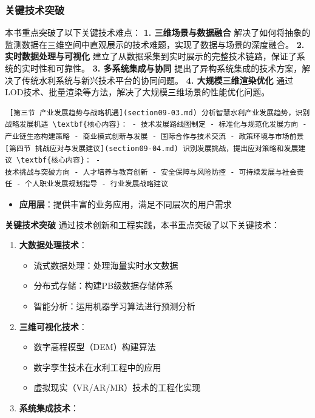 {\subsubsection{关键技术突破}\label{ux5173ux952eux6280ux672fux7a81ux7834} 本书重点突破了以下关键技术难点： \textbf{1. 三维场景与数据融合}
解决了如何将抽象的监测数据在三维空间中直观展示的技术难题，实现了数据与场景的深度融合。 \textbf{2. 实时数据处理与可视化} 建立了从数据采集到实时展示的完整技术链路，保证了系统的实时性和可靠性。 \textbf{3.
多系统集成与协同} 提出了异构系统集成的技术方案，解决了传统水利系统与新兴技术平台的协同问题。 \textbf{4. 大规模三维渲染优化} 通过LOD技术、批量渲染等方法，解决了大规模三维场景的性能优化问题。
\begin{verbatim} [第三节 产业发展趋势与战略机遇](section09-03.md) 分析智慧水利产业发展趋势，识别战略发展机遇 \textbf{核心内容}： - 技术发展路线图制定 - 标准化与规范化发展方向 -
产业链生态构建策略 - 商业模式创新与发展 - 国际合作与技术交流 - 政策环境与市场前景 [第四节 挑战应对与发展建议](section09-04.md) 识别发展挑战，提出应对策略和发展建议 \textbf{核心内容}： -
技术挑战与突破方向 - 人才培养与教育创新 - 安全保障与风险防控 - 可持续发展与社会责任 - 个人职业发展规划指导 - 行业发展战略建议 \end{verbatim} \begin{itemize} \tightlist \item
\textbf{应用层}：提供丰富的业务应用，满足不同层次的用户需求 \end{itemize} \textbf{关键技术突破} 通过技术创新和工程实践，本书重点突破了以下关键技术： \begin{enumerate}
\def\labelenumi{\arabic{enumi}.} \tightlist \item \textbf{大数据处理技术}： \begin{itemize} \tightlist \item 流式数据处理：处理海量实时水文数据
\item 分布式存储：构建PB级数据存储体系 \item 智能分析：运用机器学习算法进行预测分析 \end{itemize} \item \textbf{三维可视化技术}： \begin{itemize} \tightlist \item
数字高程模型（DEM）构建算法 \item 数字孪生技术在水利工程中的应用 \item 虚拟现实（VR/AR/MR）技术的工程化实现 \end{itemize} \item \textbf{系统集成技术}： \begin{itemize}

\end{itemize}
\end{enumerate}}
